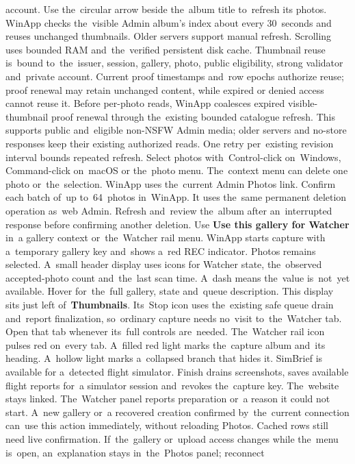 \documentclass[11pt,a4paper]{article}
\newcommand{\ui}[1]{\textbf{#1}}
\begin{document}
account. Use the~circular arrow beside the~album title to~refresh its photos.
WinApp checks the~visible Admin album's index about every 30~seconds and
reuses unchanged thumbnails. Older servers support manual refresh.
Scrolling uses bounded RAM and~the~verified persistent disk cache. Thumbnail
reuse is~bound to~the~issuer, session, gallery, photo, public eligibility,
strong validator and~private account. Current proof timestamps and~row epochs
authorize reuse; proof renewal may retain unchanged content, while expired or
denied access cannot reuse it. Before per-photo reads, WinApp coalesces expired
visible-thumbnail proof renewal through the~existing bounded catalogue refresh.
This supports public and~eligible non-NSFW Admin media; older servers and
no-store responses keep their existing authorized reads. One retry per~existing
revision interval bounds repeated refresh.
Select photos with~Control-click on~Windows, Command-click on~macOS or
the~photo menu. The~context menu can delete one photo or~the~selection.
WinApp uses the~current Admin Photos link. Confirm each batch of~up
to~64~photos in~WinApp. It uses the~same permanent deletion
operation as~web Admin. Refresh and~review the~album after an~interrupted
response before confirming another deletion.
Use \textbf{Use this gallery for Watcher} in~a gallery context or~the~Watcher
rail menu. WinApp starts capture with a~temporary gallery key and~shows a~red
REC indicator. Photos remains selected. A~small header display uses icons for
Watcher state, the~observed accepted-photo count and~the~last scan time.
A~dash means the~value is~not~yet available. Hover for~the~full gallery,
state and~queue description. This display sits just left of~\ui{Thumbnails}.
Its~Stop icon uses the~existing safe queue drain and~report finalization,
so~ordinary capture needs no~visit to~the~Watcher tab. Open that tab whenever
its~full controls are~needed. The~Watcher rail icon pulses red on~every tab. A~filled red
light marks the~capture album and~its heading. A~hollow light marks
a~collapsed branch that hides it.
SimBrief is available for a~detected flight simulator. Finish
drains screenshots, saves available flight reports for~a simulator session
and~revokes the~capture key. The~website stays linked.
The~Watcher panel reports preparation or~a reason it could not start.
A~new gallery or~a recovered creation confirmed by~the~current connection
can~use this action immediately, without reloading Photos. Cached rows still
need live confirmation. If~the~gallery or~upload access changes while
the~menu is~open, an~explanation stays in~the~Photos panel; reconnect
\end{document}
